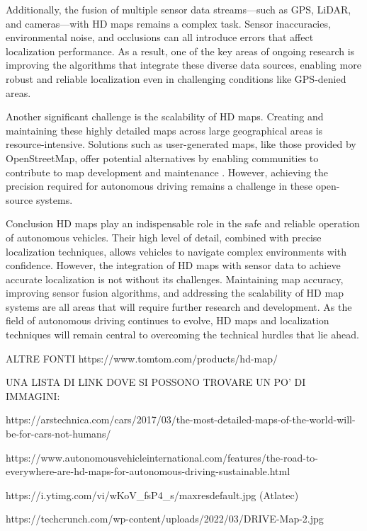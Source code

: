 Additionally, the fusion of multiple sensor data streams—such as GPS, LiDAR, and cameras—with HD maps remains a complex task. Sensor inaccuracies, environmental noise, and occlusions can all introduce errors that affect localization performance. As a result, one of the key areas of ongoing research is improving the algorithms that integrate these diverse data sources, enabling more robust and reliable localization even in challenging conditions like GPS-denied areas.

Another significant challenge is the scalability of HD maps. Creating and maintaining these highly detailed maps across large geographical areas is resource-intensive. Solutions such as user-generated maps, like those provided by OpenStreetMap, offer potential alternatives by enabling communities to contribute to map development and maintenance . However, achieving the precision required for autonomous driving remains a challenge in these open-source systems.

Conclusion
HD maps play an indispensable role in the safe and reliable operation of autonomous vehicles. Their high level of detail, combined with precise localization techniques, allows vehicles to navigate complex environments with confidence. However, the integration of HD maps with sensor data to achieve accurate localization is not without its challenges. Maintaining map accuracy, improving sensor fusion algorithms, and addressing the scalability of HD map systems are all areas that will require further research and development. As the field of autonomous driving continues to evolve, HD maps and localization techniques will remain central to overcoming the technical hurdles that lie ahead.







ALTRE FONTI 
https://www.tomtom.com/products/hd-map/

UNA LISTA DI LINK DOVE SI POSSONO TROVARE UN PO' DI IMMAGINI:

https://arstechnica.com/cars/2017/03/the-most-detailed-maps-of-the-world-will-be-for-cars-not-humans/

https://www.autonomousvehicleinternational.com/features/the-road-to-everywhere-are-hd-maps-for-autonomous-driving-sustainable.html

https://i.ytimg.com/vi/wKoV_fsP4_s/maxresdefault.jpg (Atlatec)

https://techcrunch.com/wp-content/uploads/2022/03/DRIVE-Map-2.jpg

